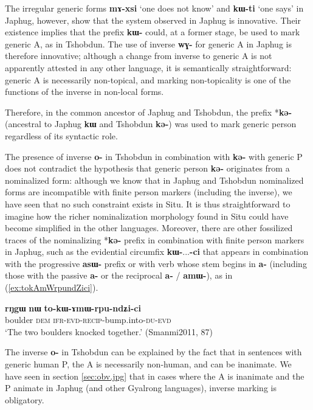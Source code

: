 \documentclass[oneside,a4paper,11pt]{article}
\newcommand{\ipa}[1]{\textbf{\phon\mbox{#1}}} %
\newcommand{\refb}[1]{(\ref{#1})}
\begin{document}
The irregular generic  forms \ipa{mɤ-xsi} `one does not know' and \ipa{kɯ-ti} `one says'  in Japhug, however, show that the system observed in Japhug is innovative. Their existence  implies that the prefix \ipa{kɯ-} could, at a former stage, be used to mark generic A, as in Tshobdun. The use of inverse \ipa{wɣ-} for generic A in Japhug is therefore innovative; although a change from inverse to generic A is not apparently attested in any other language, it is semantically straightforward: generic A is necessarily non-topical, and marking non-topicality is one of the functions of the inverse in non-local forms.

Therefore, in the common ancestor of Japhug and Tshobdun, the prefix *\ipa{kə-} (ancestral to Japhug \ipa{kɯ} and Tshobdun \ipa{kə-}) was used to mark generic person regardless of its syntactic role.  

 The presence of inverse \ipa{o-} in Tshobdun in combination with \ipa{kə-} with generic P does not contradict the hypothesis that generic person \ipa{kə-} originates from a nominalized form: although we know that in Japhug and Tshobdun nominalized forms are incompatible with finite person markers (including the inverse), we have seen that no such constraint exists in Situ. It is thus straightforward to imagine how the richer nominalization morphology found in Situ could have become simplified in the other languages. Moreover, there are other fossilized traces of the nominalizing *\ipa{kə-} prefix in combination with finite person markers in Japhug, such as the evidential circumfix \ipa{kɯ-}...\ipa{-ci} that appears in combination with the progressive \ipa{asɯ-} prefix or with verb whose stem begins in \ipa{a-} (including those with the passive \ipa{a-} or the reciprocal \ipa{a-} / \ipa{amɯ-}), as in \refb{ex:tokAmWrpundZici}. 


\begin{exe}
\ex \label{ex:tokAmWrpundZici}
\gll \ipa{rŋgɯ}  	\ipa{nɯ}  	\ipa{to-kɯ-ɤmɯ-rpu-ndʑi-ci}  \\
boulder \textsc{dem} \textsc{ifr}-\textsc{evd}-\textsc{recip}-bump.into-\textsc{du}-\textsc{evd} \\
\glt `The two boulders knocked together.' (Smanmi2011, 87)
\end{exe}


The inverse  \ipa{o-} in Tshobdun can be explained by  the fact that in sentences with generic human P, the A is necessarily non-human, and can be inanimate. We have seen in section \ref{sec:obv.jpg} that in cases where the A is inanimate and the P animate in Japhug (and other Gyalrong languages), inverse marking is obligatory. 
\end{document}
